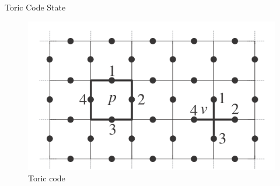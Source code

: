 \begin{frame}{Toric Code State}
\begin{figure}
\centering
\includegraphics[width=\textwidth]{diagrams/WUl3V.png}
\caption{Toric code}
\end{figure}
\end{frame}